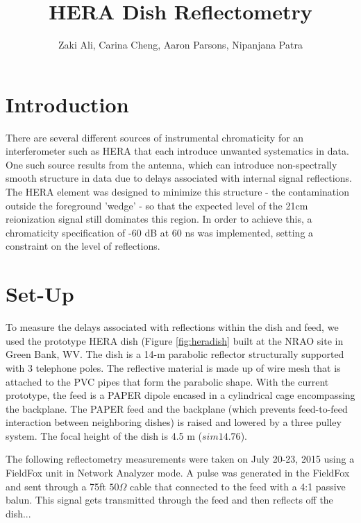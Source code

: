 \documentclass[12pt,preprint]{aastex}
\begin{document}
\title{HERA Dish Reflectometry} 
\author{Zaki Ali, Carina Cheng, Aaron Parsons, Nipanjana Patra}
\maketitle

\section{Introduction}

There are several different sources of instrumental chromaticity for an interferometer such as HERA that each introduce unwanted systematics in data. One such source results from the antenna, which can introduce non-spectrally smooth structure in data due to delays associated with internal signal reflections. The HERA element was designed to minimize this structure - the contamination outside the foreground 'wedge' - so that the expected level of the 21cm reionization signal still dominates this region. In order to achieve this, a chromaticity specification of -60 dB at 60 ns was implemented, setting a constraint on the level of reflections.


\section{Set-Up}

To measure the delays associated with reflections within the dish and feed, we
used the prototype HERA dish (Figure \ref{fig:heradish} built at the NRAO site in
Green Bank, WV. The dish is a 14-m parabolic reflector structurally supported
with 3 telephone poles. The reflective material is made up of wire mesh that
is attached to the PVC pipes that form the parabolic shape. With the current
prototype, the feed is a PAPER dipole encased in a cylindrical cage encompassing
the backplane. The PAPER feed and the backplane (which prevents feed-to-feed
interaction between neighboring dishes) is raised and lowered by a three pulley
system. The focal height of the dish is 4.5 m ($sim{14.76}$).

The following reflectometry measurements were taken on July 20-23, 2015 using a
FieldFox unit in Network Analyzer mode. A pulse was generated in the FieldFox
and sent through a 75ft $50\Omega$ cable that connected to the feed with a 4:1
passive balun. This signal gets transmitted through the feed and then reflects
off the dish...
\end{document}
